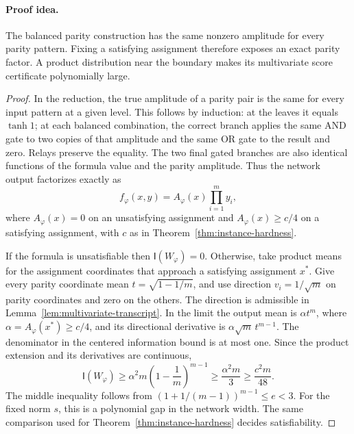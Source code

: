 \paragraph{Proof idea.}
The balanced parity construction has the same nonzero amplitude
for every parity pattern. Fixing a satisfying assignment therefore exposes
an exact parity factor. A product distribution near the boundary makes its
multivariate score certificate polynomially large.

\begin{proof}
In the reduction, the true amplitude of a parity pair is the same
for every input pattern at a given level.  This follows by
induction: at the leaves it equals \(\tanh1\); at each balanced
combination, the correct branch applies the same AND gate to two
copies of that amplitude and the same OR gate to the result and
zero.  Relays preserve the equality.  The two final gated branches
are also identical functions of the formula value and the parity
amplitude.  Thus the network output factorizes exactly as
\[
 f_\varphi(x,y)=A_\varphi(x)\prod_{i=1}^m y_i,
\]
where \(A_\varphi(x)=0\) on an unsatisfying assignment and
\(A_\varphi(x)\ge c/4\) on a satisfying assignment, with
\(c\) as in Theorem~\ref{thm:instance-hardness}.

If the formula is unsatisfiable then \(\mathsf I(W_\varphi)=0\).
Otherwise, take product means for the assignment coordinates that
approach a satisfying assignment \(x^*\).  Give every parity
coordinate mean \(t=\sqrt{1-1/m}\), and use direction
\(v_i=1/\sqrt m\) on parity coordinates and zero on the others.
The direction is admissible in
Lemma~\ref{lem:multivariate-transcript}.  In the limit the output
mean is \(\alpha t^m\), where
\(\alpha=A_\varphi(x^*)\ge c/4\), and its directional derivative
is \(\alpha\sqrt m\,t^{m-1}\).  The denominator in the
centered information bound is at most one.  Since the product
extension and its derivatives are continuous,
\[
 \mathsf I(W_\varphi)\ge
 \alpha^2m\left(1-\frac1m\right)^{m-1}
 \ge\frac{\alpha^2m}{3}
 \ge\frac{c^2m}{48}.
\]
The middle inequality follows from
\((1+1/(m-1))^{m-1}\le e<3\).
For the fixed norm \(s\), this is a polynomial gap in the
network width.  The same comparison used for
Theorem~\ref{thm:instance-hardness} decides satisfiability.
\end{proof}

